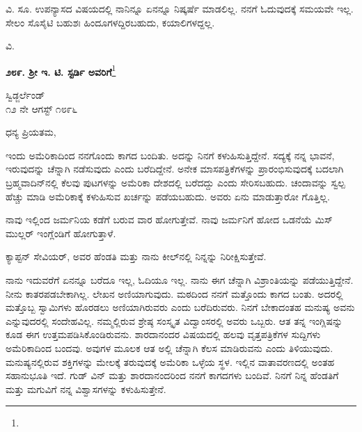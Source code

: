 ವಿ. ಸೂ.\enginline{-} ಉಪನ್ಯಾಸದ ವಿಷಯದಲ್ಲಿ ನಾನಿನ್ನೂ ಏನನ್ನೂ ನಿಷ್ಕರ್ಷೆ ಮಾಡಲಿಲ್ಲ. ನನಗೆ ಓದುವುದಕ್ಕೆ ಸಮಯವೇ ಇಲ್ಲ. ಸೇಲಂ ಸೊಸೈಟಿ ಬಹುಶಃ ಹಿಂದೂಗಳದ್ದಿರಬಹುದು, ಕಯಾಲಿಗಳದ್ದಲ್ಲ.

\vspace{-.4cm}

{\flushright
ವಿ.\par}

\begin{center}
\textbf{೨೮೯. ಶ‍್ರೀ ಇ. ಟಿ. ಸ್ಟರ್ಡಿ ಅವರಿಗೆ}\footnote{}
\end{center}

\begin{flushright}
ಸ್ವಿಡ್ಜರ್ಲೆಂಡ್\\೧೨ ನೇ ಆಗಸ್ಟ್ ೧೮೯೬
\end{flushright}

\noindent
ಧನ್ಯ ಪ್ರಿಯತಮ,

ಇಂದು ಅಮೆರಿಕಾದಿಂದ ನನಗೊಂದು ಕಾಗದ ಬಂದಿತು. ಅದನ್ನು ನಿನಗೆ ಕಳುಹಿಸು\break ತ್ತಿದ್ದೇನೆ. ಸದ್ಯಕ್ಕೆ ನನ್ನ ಭಾವನೆ, ಇರುವುದನ್ನು ಚೆನ್ನಾಗಿ ನಡೆಸುವುದು ಎಂದು ಬರೆದಿದ್ದೇನೆ. ಅನೇಕ ಮಾಸಪತ್ರಿಕೆಗಳನ್ನು ಪ್ರಾರಂಭಿಸುವುದಕ್ಕೆ ಬದಲಾಗಿ ಬ್ರಹ್ಮವಾದಿನ್‌ನಲ್ಲಿ ಕೆಲವು ಪುಟಗಳನ್ನು\enginline{-} ಅಮೆರಿಕಾ ದೇಶದಲ್ಲಿ ಬರೆದದ್ದು\enginline{-} ಎಂದು ಸೇರಿಸಬಹುದು. ಚಂದಾವನ್ನು ಸ್ವಲ್ಪ ಹೆಚ್ಚು ಮಾಡಿ ಅಮೆರಿಕಾಕ್ಕೆ ಕಳುಹಿಸುವ ಖರ್ಚನ್ನು ಪಡೆಯಬಹುದು. ಅವರು ಏನು ಮಾಡುತ್ತಾರೋ ಗೊತ್ತಿಲ್ಲ.

ನಾವು ಇಲ್ಲಿಂದ ಜರ್ಮನಿಯ ಕಡೆಗೆ ಬರುವ ವಾರ ಹೋಗುತ್ತೇವೆ. ನಾವು ಜರ್ಮನಿಗೆ ಹೋದ ಒಡನೆಯೆ ಮಿಸ್ ಮುಲ್ಲರ್ ಇಂಗ್ಲೆಂಡಿಗೆ ಹೋಗುತ್ತಾಳೆ.

ಕ್ಯಾಪ್ಟನ್ ಸೇವಿಯರ್, ಅವರ ಹೆಂಡತಿ ಮತ್ತು ನಾನು ಕೀಲ್‌ನಲ್ಲಿ ನಿನ್ನನ್ನು ನಿರೀಕ್ಷಿಸುತ್ತೇವೆ.


ನಾನು ಇದುವರೆಗೆ ಏನನ್ನೂ ಬರೆದೂ ಇಲ್ಲ, ಓದಿಯೂ ಇಲ್ಲ. ನಾನು ಈಗ ಚೆನ್ನಾಗಿ ವಿಶ್ರಾಂತಿಯನ್ನು ಪಡೆಯುತ್ತಿದ್ದೇನೆ. ನೀನು ಕಾತರಪಡಬೇಕಾಗಿಲ್ಲ. ಲೇಖನ ಅಣಿಯಾಗುವುದು. ಮಠದಿಂದ ನನಗೆ ಮತ್ತೊಂದು ಕಾಗದ ಬಂತು. ಅದರಲ್ಲಿ ಮತ್ತೊಬ್ಬ ಸ್ವಾಮಿಗಳು ಹೊರಡಲು ಅಣಿಯಾಗಿರುವರು ಎಂದು ಬರೆದಿರುವರು. ನಿನಗೆ ಬೇಕಾದಂತಹ ಮನುಷ್ಯ ಅವನು ಎನ್ನುವುದರಲ್ಲಿ ಸಂದೇಹವಿಲ್ಲ. ನಮ್ಮಲ್ಲಿರುವ ಶ್ರೇಷ್ಠ ಸಂಸ್ಕೃತ ವಿದ್ವಾಂಸರಲ್ಲಿ ಅವರು ಒಬ್ಬರು. ಆತ ತನ್ನ ಇಂಗ್ಲಿಷನ್ನು ಕೂಡ ಈಗ ಉತ್ತಮಪಡಿಸಿಕೊಂಡಿರುವನು. ಶಾರದಾನಂದರ ವಿಷಯದಲ್ಲಿ ಹಲವು ವೃತ್ತಪತ್ರಿಕೆಗಳ ಸುದ್ದಿಗಳು ಅಮೆರಿಕಾದಿಂದ ಬಂದವು. ಅವುಗಳ ಮೂಲಕ ಆತ ಅಲ್ಲಿ ಚೆನ್ನಾಗಿ ಕೆಲಸ ಮಾಡಿರುವನು ಎಂದು ತಿಳಿಯುವುದು. ಮನುಷ್ಯನಲ್ಲಿರುವ ಶಕ್ತಿಗಳನ್ನು ಮೇಲಕ್ಕೆ ತರುವುದಕ್ಕೆ ಅಮೆರಿಕಾ ಒಳ್ಳೆಯ ಸ್ಥಳ. ಇಲ್ಲಿನ ವಾತಾವರಣದಲ್ಲಿ ಅಂತಹ ಸಹಾನುಭೂತಿ ಇದೆ. ಗುಡ್ ವಿನ್ ಮತ್ತು ಶಾರದಾನಂದರಿಂದ ನನಗೆ ಕಾಗದಗಳು ಬಂದಿವೆ. ನಿನಗೆ ನಿನ್ನ ಹೆಂಡತಿಗೆ ಮತ್ತು ಮಗುವಿಗೆ ನನ್ನ ವಿಶ್ವಾಸಗಳನ್ನು ಕಳುಹಿಸುತ್ತೇನೆ.

\vspace{0.1cm}

\vspace{-0.3cm}

